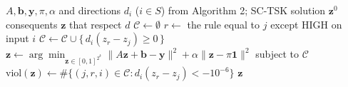 


\setcounter{algorithm}{2}
\begin{algorithm}[H]
\caption{SM-TSK: monotone consequents}
\begin{algorithmic}[1]
\Require $A, \mathbf{b}, \mathbf{y}, \pi, \alpha$ and directions $d_i$ ($i \in S$) from Algorithm 2; SC-TSK solution $\mathbf{z}^0$
\Ensure consequents $\mathbf{z}$ that respect $d$
\State $\mathcal{C} \gets \emptyset$
  \State $r \gets$ the rule equal to $j$ except HIGH on input $i$
  \State $\mathcal{C} \gets \mathcal{C} \cup \{\, d_i (z_r - z_j) \ge 0 \,\}$ 
\EndFor
\State $\mathbf{z} \gets \arg\min_{\mathbf{z} \in [0,1]^{2^k}} \|A\mathbf{z} + \mathbf{b} - \mathbf{y}\|^2 + \alpha\|\mathbf{z} - \pi\mathbf{1}\|^2$ subject to $\mathcal{C}$ 
\State $\mathrm{viol}(\mathbf{z}) \gets \#\{(j, r, i) \in \mathcal{C} : d_i(z_r - z_j) < -10^{-6}\}$
\State \Return $\mathbf{z}$
\end{algorithmic}
\end{algorithm}


